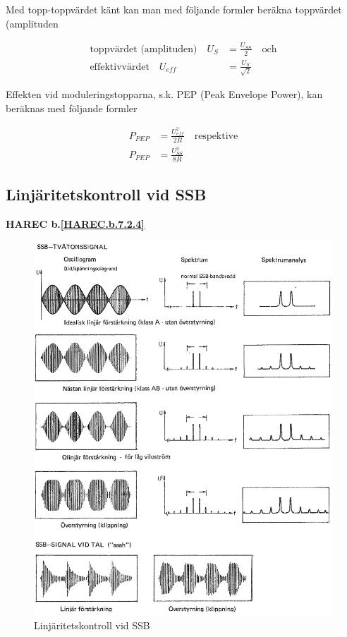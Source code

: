 Med topp-toppvärdet känt kan man med följande formler beräkna
toppvärdet (amplituden

\begin{align*}
  \text{toppvärdet (amplituden)} \quad
  U_S & = \frac{U_{SS}}{2}
  \quad \text{och} \\
  \text{effektivvärdet} \quad
  U_{eff} & = \frac{U_S}{\sqrt{2}}
\end{align*}

Effekten vid moduleringstopparna, s.k. PEP (Peak Envelope Power), kan
beräknas med följande formler

\begin{align*}
  P_{PEP} &= \frac{U_{eff}^2}{2R} \quad \text{respektive} \\
  P_{PEP} &= \frac{U_{SS}^2}{8R}
\end{align*}

\subsection{Linjäritetskontroll vid SSB}
\textbf{HAREC
  b.\ref{HAREC.b.7.2.4}\label{myHAREC.b.7.2.4}
}

\begin{figure}
\includegraphics[width=\textwidth]{images/cropped_pdfs/bild_2_3-53.pdf}
\caption{Linjäritetskontroll vid SSB}
\label{fig:BildII3-53}
\end{figure}

